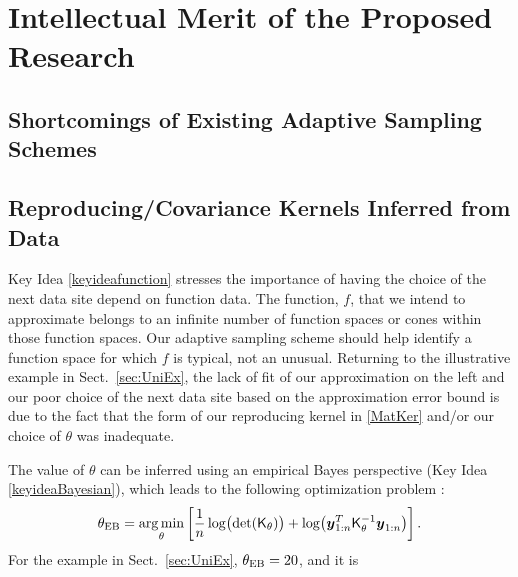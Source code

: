 \documentclass[11pt]{NSFamsart}
\DeclareMathOperator*{\argmin}{arg\,min}
\newcommand{\mK}{\mathsf{K}}
\newcommand{\by}{{\boldsymbol{y}}}
\begin{document}
\section{Intellectual Merit of the Proposed Research} \label{sec:Proposed}

\subsection{Shortcomings of Existing Adaptive Sampling Schemes} \label{sec:shortExist}

\subsection{Reproducing/Covariance Kernels Inferred from Data} \label{sec:kerinferdata}
Key Idea \ref{keyideafunction} stresses the importance of having the choice of the next data site depend on function data.  The function, $f$, that we intend to approximate belongs to an infinite number of function spaces or cones within those function spaces.  Our adaptive sampling scheme should help identify a function space for which $f$ is typical, not an unusual.  Returning to the illustrative example in Sect.\ \ref{sec:UniEx}, the lack of fit of our approximation on the left and our poor choice of the next data site based on the approximation error bound is due to the fact that the form of our reproducing kernel in \eqref{MatKer} and/or our choice of $\theta$ was inadequate.

The value of $\theta$ can be inferred using an empirical Bayes perspective (Key Idea \ref{keyideaBayesian}), which leads to the following optimization problem \cite{Hic17a}: 
\begin{equation}
    \theta_{\textup{EB}} = \argmin_\theta \left[\frac 1n \log \bigl( \det(\mK_\theta) \bigr) + \log \bigl ( \by_{1:n}^T \mK_\theta^{-1} \by_{1:n} \bigr)\right].
\end{equation}
For the example in Sect.\ \ref{sec:UniEx}, $\theta_{\textup{EB}} = 20$, and it is 
\end{document}
